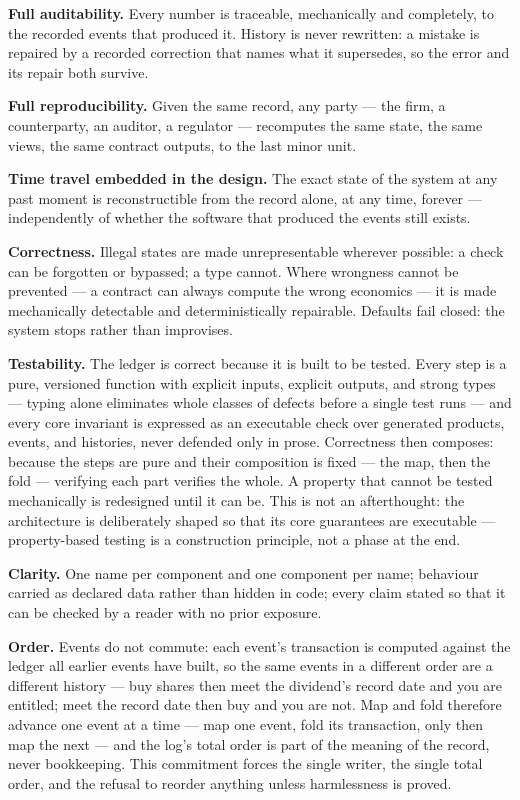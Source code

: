 \documentclass[11pt,a4paper]{article}
\newcommand{\clabel}[1]{\leavevmode\hypertarget{clause-#1}{}%
  \marginpar{\raggedright\scriptsize\ttfamily\textcolor{gray}{#1}}}
\begin{document}
\clabel{C-2.1}\textbf{Full auditability.} Every number is traceable, mechanically and
completely, to the recorded events that produced it. History is never
rewritten: a mistake is repaired by a recorded correction that names
what it supersedes, so the error and its repair both survive.

\clabel{C-2.2}\textbf{Full reproducibility.} Given the same record, any party --- the
firm, a counterparty, an auditor, a regulator --- recomputes the same
state, the same views, the same contract outputs, to the last minor
unit.

\clabel{C-2.3}\textbf{Time travel embedded in the design.} The exact state of the
system at any past moment is reconstructible from the record alone, at
any time, forever --- independently of whether the software that
produced the events still exists.

\clabel{C-2.4}\textbf{Correctness.} Illegal states are made unrepresentable wherever
possible: a check can be forgotten or bypassed; a type cannot. Where
wrongness cannot be prevented --- a contract can always compute the
wrong economics --- it is made mechanically detectable and
deterministically repairable. Defaults fail closed: the system stops
rather than improvises.

\clabel{C-2.5}\textbf{Testability.} The ledger is correct because it is built to be
tested. Every step is a pure, versioned function with explicit inputs,
explicit outputs, and strong types --- typing alone eliminates whole
classes of defects before a single test runs --- and every core
invariant is expressed as an executable check over generated products,
events, and histories, never defended only in prose. Correctness then
composes: because the steps are pure and their composition is fixed ---
the map, then the fold --- verifying each part verifies the whole. A
property that cannot be tested mechanically is redesigned until it can
be. This is not an afterthought: the architecture is deliberately shaped
so that its core guarantees are executable --- property-based testing is
a construction principle, not a phase at the end.

\clabel{C-2.6}\textbf{Clarity.} One name per component and one component
per name; behaviour carried as declared data rather than hidden in code;
every claim stated so that it can be checked by a reader with no prior
exposure.

\clabel{C-2.7}\textbf{Order.} Events do not commute: each event's
transaction is computed against the ledger all earlier events have
built, so the same events in a different order are a different history
--- buy shares then meet the dividend's record date and you are
entitled; meet the record date then buy and you are not. Map and fold
therefore advance one event at a time --- map one event, fold its
transaction, only then map the next --- and the log's total order is
part of the meaning of the record, never bookkeeping. This commitment
forces the single writer, the single total order, and the refusal to
reorder anything unless harmlessness is proved.
\end{document}
